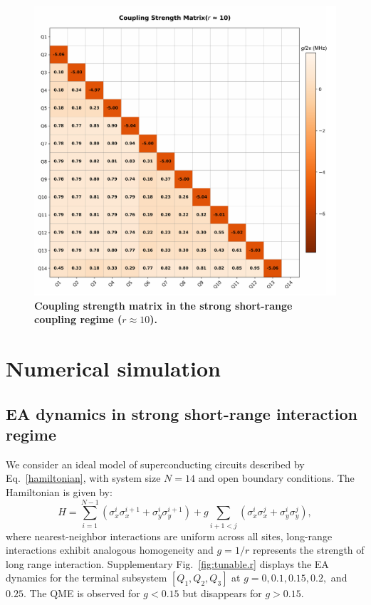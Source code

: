 \documentclass[reprint,superscriptaddress,preprintnumbers,longbibliography,
amsmath,amssymb,aps,floatfix,pra,twocolumn, tightenlines %
]{revtex4-2}
\begin{document}
	\begin{figure}
		\centering
		\includegraphics[width=1.0\linewidth]{suppFig/FigureSI_g_r10.pdf}
		\caption{\textbf{Coupling strength matrix in the strong short-range coupling regime ($r\approx10$).} }
		\label{r10}
	\end{figure}
	
	\clearpage
	\newpage
	
    \section{Numerical simulation}
     
    \subsection{EA dynamics in strong short-range interaction regime}
     
    We consider an ideal model of superconducting circuits described by Eq.~\eqref{hamiltonian}, with system size $N=14$ and open boundary conditions. The Hamiltonian is given by:
    \begin{equation}
    H = \sum_{i=1}^{N-1} \left( \sigma_x^i\sigma_x^{i+1} + \sigma_y^i\sigma_y^{i+1} \right) + g \sum_{i+1<j} \left( \sigma_x^i\sigma_x^{j} + \sigma_y^i\sigma_y^{j} \right),
    \end{equation}
    where nearest-neighbor interactions are uniform across all sites, long-range interactions exhibit analogous homogeneity and $g=1/r$ represents the strength of long range interaction. 
    Supplementary Fig.~\ref{fig:tunable.r} displays the EA dynamics for the terminal subsystem $[Q_1,Q_2,Q_3]$ at $g=0, 0.1, 0.15, 0.2,$ and $0.25$. The QME is observed for $g<0.15$ but disappears for $g>0.15$. 
    
\end{document}
